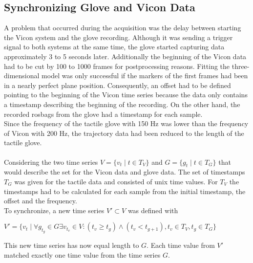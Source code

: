 \subsection{Synchronizing Glove and Vicon Data}
A problem that occurred during the acquisition was the delay between starting the Vicon system and the glove recording. Although it was sending a trigger signal to both systems at the same time, the glove started capturing data approximately 3 to 5 seconds later. Additionally the beginning of the Vicon data had to be cut by 100 to 1000 frames for postprocessing reasons. Fitting the three-dimensional model was only successful if the markers of the first frames had been in a nearly perfect plane position. Consequently, an offset had to be defined pointing to the beginning of the Vicon time series because the data only contains a timestamp describing the beginning of the recording. On the other hand, the recorded rosbags from the glove had a timestamp for each sample.\\
Since the frequency of the tactile glove with 150 Hz was lower than the frequency of Vicon with 200 Hz, the trajectory data had been reduced to the length of the tactile glove.\\
\\
Considering the two time series $V = \{v_{t} \mid t\in T_{V}\}$ and $G = \{g_{t} \mid t\in T_{G}\}$ that would describe the set for the Vicon data and glove data. The set of timestamps $T_{G}$ was given for the tactile data and consisted of unix time values. For $T_{V}$ the timestamps had to be calculated for each sample from the initial timestamp, the offset and the frequency. \\
To synchronize, a new time series $V' \subset V$ was defined with \begin{center}
$V' = \{v_{t} \mid \forall g_{t_{g}} \in G \exists v_{t_{v}} \in V : (t_{v} \geq t_{g}) \wedge (t_{v} < t_{g+1}), t_{v} \in T_{V}, t_{g} \in T_{G} \}$
\end{center}
This new time series has now equal length to $G$. Each time value from $V'$ matched exactly one time value from the time series $G$.
